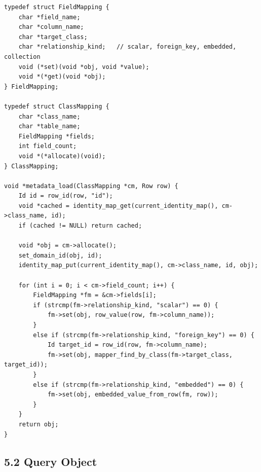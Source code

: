 \documentclass[11pt]{article}
\begin{document}
\begin{verbatim}
typedef struct FieldMapping {
    char *field_name;
    char *column_name;
    char *target_class;
    char *relationship_kind;   // scalar, foreign_key, embedded, collection
    void (*set)(void *obj, void *value);
    void *(*get)(void *obj);
} FieldMapping;

typedef struct ClassMapping {
    char *class_name;
    char *table_name;
    FieldMapping *fields;
    int field_count;
    void *(*allocate)(void);
} ClassMapping;

void *metadata_load(ClassMapping *cm, Row row) {
    Id id = row_id(row, "id");
    void *cached = identity_map_get(current_identity_map(), cm->class_name, id);
    if (cached != NULL) return cached;

    void *obj = cm->allocate();
    set_domain_id(obj, id);
    identity_map_put(current_identity_map(), cm->class_name, id, obj);

    for (int i = 0; i < cm->field_count; i++) {
        FieldMapping *fm = &cm->fields[i];
        if (strcmp(fm->relationship_kind, "scalar") == 0) {
            fm->set(obj, row_value(row, fm->column_name));
        }
        else if (strcmp(fm->relationship_kind, "foreign_key") == 0) {
            Id target_id = row_id(row, fm->column_name);
            fm->set(obj, mapper_find_by_class(fm->target_class, target_id));
        }
        else if (strcmp(fm->relationship_kind, "embedded") == 0) {
            fm->set(obj, embedded_value_from_row(fm, row));
        }
    }
    return obj;
}
\end{verbatim}

\subsection{5.2 Query Object}\label{query-object}
\end{document}
